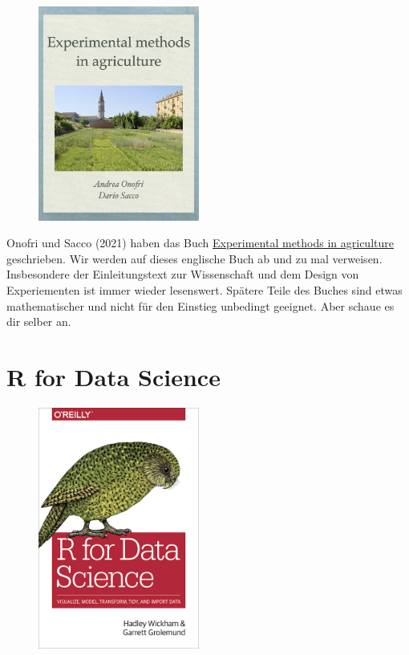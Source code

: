 \documentclass[
  letterpaper,
  DIV=11,
  oneside]{scrreport}
\begin{document}
\begin{figure}

{\centering \includegraphics[width=2.08333in,height=\textheight]{./images/cover_stat_for_biology.jpeg}

}

\end{figure}

Onofri und Sacco (2021) haben das Buch
\href{https://www.statforbiology.com/_statbookeng/}{Experimental methods
in agriculture} geschrieben. Wir werden auf dieses englische Buch ab und
zu mal verweisen. Insbesondere der Einleitungstext zur Wissenschaft und
dem Design von Experiementen ist immer wieder lesenswert. Spätere Teile
des Buches sind etwas mathematischer und nicht für den Einstieg
unbedingt geeignet. Aber schaue es dir selber an.

\hypertarget{r-for-data-science}{%
\section{R for Data Science}\label{r-for-data-science}}

\begin{figure}

{\centering \includegraphics[width=2.08333in,height=\textheight]{./images/hadley.png}

}

\end{figure}
\end{document}
